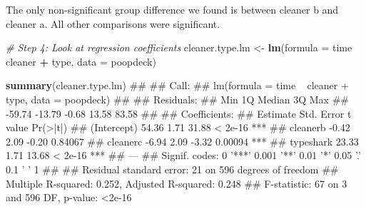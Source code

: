\documentclass[]{book}
\newenvironment{Shaded}{\begin{snugshade}}{\end{snugshade}}
\newcommand{\KeywordTok}[1]{\textcolor[rgb]{0.13,0.29,0.53}{\textbf{#1}}}
\newcommand{\DataTypeTok}[1]{\textcolor[rgb]{0.13,0.29,0.53}{#1}}
\newcommand{\StringTok}[1]{\textcolor[rgb]{0.31,0.60,0.02}{#1}}
\newcommand{\CommentTok}[1]{\textcolor[rgb]{0.56,0.35,0.01}{\textit{#1}}}
\newcommand{\OperatorTok}[1]{\textcolor[rgb]{0.81,0.36,0.00}{\textbf{#1}}}
\newcommand{\NormalTok}[1]{#1}
\theoremstyle{definition}
\theoremstyle{definition}
\theoremstyle{remark}
\begin{document}
\begin{Shaded}
\end{Shaded}

The only non-significant group difference we found is between cleaner b
and cleaner a. All other comparisons were significant.

\begin{Shaded}
\begin{Highlighting}[]
\CommentTok{# Step 4: Look at regression coefficients}
\NormalTok{cleaner.type.lm <-}\StringTok{ }\KeywordTok{lm}\NormalTok{(}\DataTypeTok{formula =}\NormalTok{ time }\OperatorTok{~}\StringTok{ }\NormalTok{cleaner }\OperatorTok{+}\StringTok{ }\NormalTok{type,}
                      \DataTypeTok{data =}\NormalTok{ poopdeck)}

\KeywordTok{summary}\NormalTok{(cleaner.type.lm)}
\NormalTok{## }
\NormalTok{## Call:}
\NormalTok{## lm(formula = time ~ cleaner + type, data = poopdeck)}
\NormalTok{## }
\NormalTok{## Residuals:}
\NormalTok{##    Min     1Q Median     3Q    Max }
\NormalTok{## -59.74 -13.79  -0.68  13.58  83.58 }
\NormalTok{## }
\NormalTok{## Coefficients:}
\NormalTok{##             Estimate Std. Error t value Pr(>|t|)    }
\NormalTok{## (Intercept)    54.36       1.71   31.88  < 2e-16 ***}
\NormalTok{## cleanerb       -0.42       2.09   -0.20  0.84067    }
\NormalTok{## cleanerc       -6.94       2.09   -3.32  0.00094 ***}
\NormalTok{## typeshark      23.33       1.71   13.68  < 2e-16 ***}
\NormalTok{## ---}
\NormalTok{## Signif. codes:  0 '***' 0.001 '**' 0.01 '*' 0.05 '.' 0.1 ' ' 1}
\NormalTok{## }
\NormalTok{## Residual standard error: 21 on 596 degrees of freedom}
\NormalTok{## Multiple R-squared:  0.252,  Adjusted R-squared:  0.248 }
\NormalTok{## F-statistic:   67 on 3 and 596 DF,  p-value: <2e-16}
\end{Highlighting}
\end{Shaded}
\end{document}
